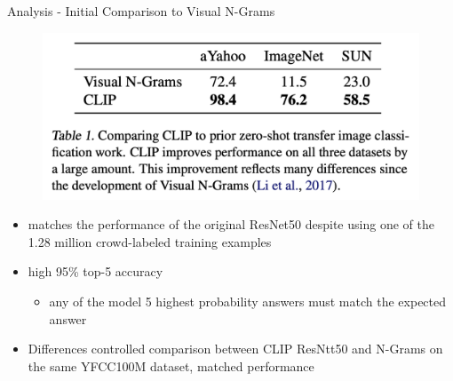 \documentclass[aspectratio=169,xcolor=dvipsnames]{beamer}
\begin{document}


\begin{frame}{Analysis - Initial Comparison to Visual N-Grams }
    \begin{figure}
        \centering
        \includegraphics[width=0.55\linewidth]{figures/comparison_visual_n_grams .png}
    \end{figure}
    \begin{itemize}
        \item matches the performance of the original ResNet50 despite using one of the 1.28 million crowd-labeled training examples
        \item high 95\% top-5 accuracy
            \begin{itemize}
                \item any of the model 5 highest probability answers must match the expected answer
            \end{itemize}
        \item Differences controlled comparison between CLIP ResNtt50 and N-Grams on the same YFCC100M dataset, matched performance
    \end{itemize}

\end{frame}

\end{document}
